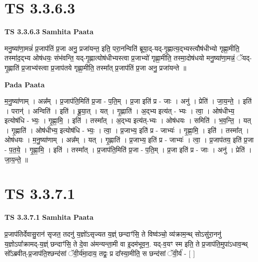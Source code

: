 \documentclass[17pt]{extarticle}
\begin{document}
\section*{ TS 3.3.6.3 }

\textbf{TS 3.3.6.3 } \newline
\textbf{Samhita Paata} \newline

मनु॒ष्या॑णा॒मन्नं॑ प्र॒जाप॑तिं प्र॒जा अनु॒ प्रजा॑यन्त॒ इति॒ परा॒नन्विति॑ ब्रूया॒द्-यद्-गृ॒ह्णात्य॒द्भ्यस्त्वौष॑धीभ्यो गृह्णा॒मीति॒ तस्मा॑द॒द्भ्य ओष॑धयः॒ संभ॑वन्ति॒ यद्-गृ॒ह्णात्योष॑धीभ्यस्त्वा प्र॒जाभ्यो॑ गृह्णा॒मीति॒ तस्मा॒दोष॑धयो मनु॒ष्या॑णा॒मन्नं॒ ॅयद्-गृ॒ह्णाति॑ प्र॒जाभ्य॑स्त्वा प्र॒जाप॑तये गृह्णा॒मीति॒ तस्मा᳚त् प्र॒जाप॑तिं प्र॒जा अनु॒ प्रजा॑यन्ते ॥ \newline

\textbf{Pada Paata} \newline

म॒नु॒ष्या॑णाम् । अन्न᳚म् । प्र॒जाप॑ति॒मिति॑ प्र॒जा - प॒ति॒म् । प्र॒जा इति॑ प्र - जाः । अनु॑ । प्रेति॑ । जा॒य॒न्ते॒ । इति॑ । परान्॑ । अन्विति॑ । इति॑ । ब्रू॒या॒त् । यत् । गृ॒ह्णाति॑ । अ॒द्भ्य इत्य॑त् - भ्यः । त्वा॒ । ओष॑धीभ्य॒ इत्योष॑धि - भ्यः॒ । गृ॒ह्णा॒मि॒ । इति॑ । तस्मा᳚त् । अ॒द्भ्य इत्य॑त्-भ्यः । ओष॑धयः । समिति॑ । भ॒व॒न्ति॒ । यत् । गृ॒ह्णाति॑ । ओष॑धीभ्य॒ इत्योष॑धि - भ्यः॒ । त्वा॒ । प्र॒जाभ्य॒ इति॑ प्र - जाभ्यः॑ । गृ॒ह्णा॒मि॒ । इति॑ । तस्मा᳚त् । ओष॑धयः । म॒नु॒ष्या॑णाम् । अन्न᳚म् । यत् । गृ॒ह्णाति॑ । प्र॒जाभ्य॒ इति॑ प्र - जाभ्यः॑ । त्वा॒ । प्र॒जाप॑तय॒ इति॑ प्र॒जा - प॒त॒ये॒ । गृ॒ह्णा॒मि॒ । इति॑ । तस्मा᳚त् । प्र॒जाप॑ति॒मिति॑ प्र॒जा - प॒ति॒म् । प्र॒जा इति॑ प्र - जाः । अनु॑ । प्रेति॑ । जा॒य॒न्ते॒ ॥  \newline




\section*{ TS 3.3.7.1 }

\textbf{TS 3.3.7.1 } \newline
\textbf{Samhita Paata} \newline

प्र॒जाप॑तिर्देवासु॒रान॑ सृजत॒ तदनु॑ य॒ज्ञो॑ऽसृज्यत य॒ज्ञ्ं छन्दाꣳ॑सि॒ ते विष्व॑ञ्चो॒ व्य॑क्राम॒न्थ् सोऽसु॑रा॒ननु॑ य॒ज्ञोऽपा᳚क्रामद्-य॒ज्ञ्ं छन्दाꣳ॑सि॒ ते दे॒वा अ॑मन्यन्ता॒मी वा इ॒दम॑भूव॒न॒. यद्-व॒यꣳ स्म इति॒ ते प्र॒जाप॑ति॒मुपा॑ऽधाव॒न्थ् सो᳚ऽब्रवीत्-प्र॒जाप॑ति॒श्छन्द॑सां ॅवी॒र्य॑मा॒दाय॒ तद्वः॒ प्र दा᳚स्या॒मीति॒ स छन्द॑सां ॅवी॒र्य॑ - [  ] \newline
\end{document}
